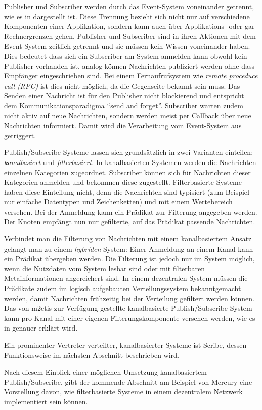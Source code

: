 Publisher und Subscriber werden durch das Event-System voneinander getrennt, wie es in  dargestellt ist. Diese Trennung bezieht sich nicht nur auf verschiedene Komponenten einer Applikation, sondern kann auch über Applikations- oder gar Rechnergrenzen gehen. Publisher und Subscriber sind in ihren Aktionen mit dem Event-System zeitlich getrennt und sie müssen kein Wissen voneinander haben. Dies bedeutet dass sich ein Subscriber am System anmelden kann obwohl kein Publisher vorhanden ist, analog können Nachrichten publiziert werden ohne dass Empfänger eingeschrieben sind. Bei einem Fernaufrufsystem wie \emph{remote proceduce call (RPC)} \cite{Birrell1984Implementing} ist dies nicht möglich, da die Gegenseite bekannt sein muss. Das Senden einer Nachricht ist für den Publisher nicht blockierend und entspricht dem Kommunikationsparadigma ``send and forget''. Subscriber warten zudem nicht aktiv auf neue Nachrichten, sondern werden meist per Callback über neue Nachrichten informiert. Damit wird die Verarbeitung vom Event-System aus getriggert. 

Publish/Subscribe-Systeme lassen sich grundsätzlich in zwei Varianten einteilen: \emph{kanalbasiert} und \emph{filterbasiert}. In kanalbasierten Systemen werden die Nachrichten einzelnen Kategorien zugeordnet. Subscriber können sich für Nachrichten dieser Kategorien anmelden und bekommen diese zugestellt. Filterbasierte Systeme haben diese Einteilung nicht, denn die Nachrichten sind typisiert (zum Beispiel nur einfache Datentypen und Zeichenketten) und mit einem Wertebereich versehen. Bei der Anmeldung kann ein Prädikat zur Filterung angegeben werden. Der Knoten empfängt nun nur gefilterte, auf das Prädikat passende Nachrichten.

Verbindet man die Filterung von Nachrichten mit einem kanalbasiertem Ansatz gelangt man zu einem \emph{hybriden} System: Einer Anmeldung an einem Kanal kann ein Prädikat übergeben werden. Die Filterung ist jedoch nur im System möglich, wenn die Nutzdaten vom System lesbar sind oder mit filterbaren Metainformationen angereichert sind. In einem dezentralen System müssen die Prädikate zudem im logisch aufgebauten Verteilungssystem bekanntgemacht werden, damit Nachrichten frühzeitig bei der Verteilung gefiltert werden können. Das von \ac{m2etis} zur Verfügung gestellte kanalbasierte Publish/Subscribe-System kann pro Kanal mit einer eigenen Filterungskomponente versehen werden, wie es in  genauer erklärt wird.

Ein prominenter Vertreter verteilter, kanalbasierter Systeme ist Scribe, dessen Funktionsweise im nächsten Abschnitt beschrieben wird.



Nach diesem Einblick einer möglichen Umsetzung kanalbasiertem Publish/Subscribe, gibt der kommende Abschnitt am Beispiel von Mercury eine Vorstellung davon, wie filterbasierte Systeme in einem dezentralem Netzwerk implementiert sein können.




